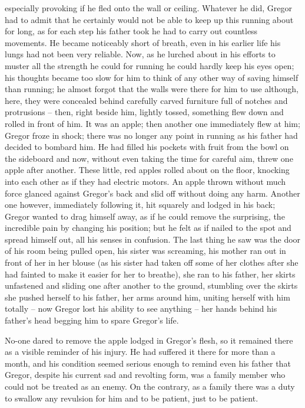 especially provoking if he fled onto the wall or ceiling. Whatever he
did, Gregor had to admit that he certainly would not be able to keep up
this running about for long, as for each step his father took he had to
carry out countless movements. He became noticeably short of breath,
even in his earlier life his lungs had not been very reliable. Now, as
he lurched about in his efforts to muster all the strength he could for
running he could hardly keep his eyes open; his thoughts became too
slow for him to think of any other way of saving himself than running;
he almost forgot that the walls were there for him to use although,
here, they were concealed behind carefully carved furniture full of
notches and protrusions – then, right beside him, lightly tossed,
something flew down and rolled in front of him. It was an apple; then
another one immediately flew at him; Gregor froze in shock; there was
no longer any point in running as his father had decided to bombard
him. He had filled his pockets with fruit from the bowl on the
sideboard and now, without even taking the time for careful aim, threw
one apple after another. These little, red apples rolled about on the
floor, knocking into each other as if they had electric motors. An
apple thrown without much force glanced against Gregor’s back and slid
off without doing any harm. Another one however, immediately following
it, hit squarely and lodged in his back; Gregor wanted to drag himself
away, as if he could remove the surprising, the incredible pain by
changing his position; but he felt as if nailed to the spot and spread
himself out, all his senses in confusion. The last thing he saw was the
door of his room being pulled open, his sister was screaming, his
mother ran out in front of her in her blouse (as his sister had taken
off some of her clothes after she had fainted to make it easier for her
to breathe), she ran to his father, her skirts unfastened and sliding
one after another to the ground, stumbling over the skirts she pushed
herself to his father, her arms around him, uniting herself with him
totally – now Gregor lost his ability to see anything – her hands behind
his father’s head begging him to spare Gregor’s life.

\endchapter


No-one dared to remove the apple lodged in Gregor’s flesh, so it
remained there as a visible reminder of his injury. He had suffered it
there for more than a month, and his condition seemed serious enough to
remind even his father that Gregor, despite his current sad and
revolting form, was a family member who could not be treated as an
enemy. On the contrary, as a family there was a duty to swallow any
revulsion for him and to be patient, just to be patient.

